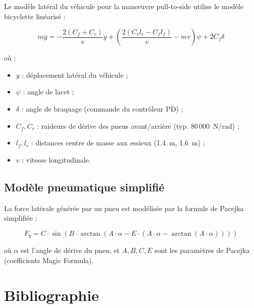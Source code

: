 \documentclass[12pt,a4paper]{report}
\begin{document}
Le mod\`ele lat\'eral du v\'ehicule pour la man\oe uvre pull-to-side utilise le mod\`ele bicy\-clette lin\'earis\'e :

\begin{equation}
  m \ddot{y} = -\frac{2(C_f + C_r)}{v} \dot{y} + \left(\frac{2(C_r l_r - C_f l_f)}{v} - mv\right)\dot{\psi} + 2C_f \delta
\end{equation}

o\`u :
\begin{itemize}
  \item $y$ : d\'eplacement lat\'eral du v\'ehicule ;
  \item $\psi$ : angle de lacet ;
  \item $\delta$ : angle de braquage (commande du contr\^oleur PD) ;
  \item $C_f, C_r$ : raideurs de d\'erive des pneus avant/arri\`ere (typ. 80\,000~N/rad) ;
  \item $l_f, l_r$ : distances centre de masse aux essieux (1.4~m, 1.6~m) ;
  \item $v$ : vitesse longitudinale.
\end{itemize}

\section{Mod\`ele pneumatique simplifi\'e}

La force lat\'erale g\'en\'er\'ee par un pneu est mod\'elis\'ee par la formule de Pacejka simplifi\'ee :

\begin{equation}
  F_y = C \cdot \sin\!\left(B \cdot \arctan(A \cdot \alpha - E \cdot (A \cdot \alpha - \arctan(A \cdot \alpha)))\right)
\end{equation}

o\`u $\alpha$ est l'angle de d\'erive du pneu, et $A, B, C, E$ sont les param\`etres de Pacejka (coefficients Magic Formula).

\clearpage

\chapter*{Bibliographie}
\end{document}
